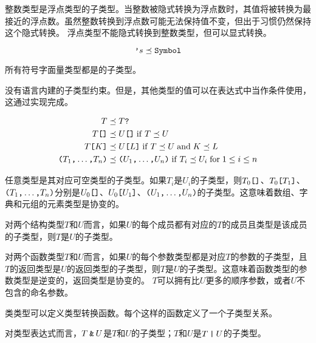 \pnum
整数类型是浮点类型的子类型。当整数被隐式转换为浮点数时，其值将被转换为最接近的浮点数。\enternote 虽然整数转换到浮点数可能无法保持值不变，但出于习惯仍然保持这个隐式转换。 \exitnote \enternote 浮点类型不能隐式转换到整数类型，但可以显式转换。 \exitnote

$$ \texttt{'}s \preceq \texttt{Symbol} $$

\pnum
所有符号字面量类型都是的子类型。

\pnum
{}没有语言内建的子类型约束。但是，其他类型的值可以在表达式中当作条件使用，这通过实现完成。

\begin{equation*}
\begin{aligned}
T &\preceq T\texttt{?} \\
T\texttt{[]} &\preceq U\texttt{[]} \mathrel{\mathrm{if}} T \preceq U \\
T\texttt{[}K\texttt{]} &\preceq U\texttt{[}L\texttt{]} \mathrel{\mathrm{if}} T \preceq U \mathrel{\mathrm{and}} K \preceq L \\
\texttt{(}T_1\texttt{,} \ldots\texttt{,} T_n\texttt{)} &\preceq \texttt{(}U_1\texttt{,} \ldots\texttt{,} U_n\texttt{)} \mathrel{\mathrm{if}} T_i \preceq U_i \mathrel{\mathrm{for}} 1 \leq i \leq n \\
\end{aligned}
\end{equation*}

\pnum
任意类型是其对应可空类型的子类型。如果$T_i$是$U_i$的子类型，则$T_0\texttt{[]}$、$T_0\texttt{[}T_1\texttt{]}$、$\texttt{(}T_1\texttt{,} \ldots\texttt{,} T_n\texttt{)}$分别是$U_0\texttt{[]}$、$U_0\texttt{[}U_1\texttt{]}$、$\texttt{(}U_1\texttt{,} \ldots\texttt{,} U_n\texttt{)}$的子类型。\enternote 这意味着数组、字典和元组的元素类型是协变的。 \exitnote

\pnum
对两个结构类型$T$和$U$而言，如果$U$的每个成员都有对应的$T$的成员且类型是该成员的子类型，则$T$是$U$的子类型。

\pnum
对两个函数类型$T$和$U$而言，如果$U$的每个参数类型都是对应$T$的参数的子类型，且$T$的返回类型是$U$的返回类型的子类型，则$T$是$U$的子类型。\enternote 这意味着函数类型的参数类型是逆变的，返回类型是协变的。 \exitnote $T$可以拥有比$U$更多的顺序参数，或者$U$不包含的命名参数。

\pnum
类类型可以定义类型转换函数。每个这样的函数定义了一个子类型关系。

\pnum
对类型表达式而言，$T\mathbin{\texttt{\&}}U$是$T$和$U$的子类型；$T$和$U$是$T\mathbin{\texttt{|}}U$的子类型。


